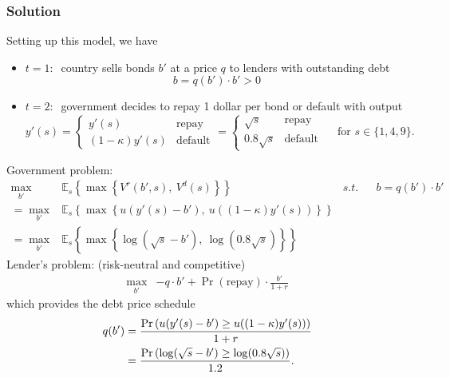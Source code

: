 \documentclass[12pt]{article}
\begin{document}
\begin{enumerate}
\begin{enumerate}[label=(\alph*)]
        \subsubsection*{Solution}

        Setting up this model, we have 
        \begin{itemize}
            \item $t=1: \ $ country sells bonds $b'$ at a price $q$ to lenders with outstanding debt 
            \[ b = q(b') \cdot b' > 0\]
            \item $t=2: \ $ government decides to repay 1 dollar per bond or default with output 
            \[ y'(s) = \begin{cases}
                y'(s) & \text{repay}
                \\ (1-\kappa)y'(s) & \text{default}
            \end{cases} = \begin{cases}
                \sqrt{s} & \text{repay}
                \\ 0.8\sqrt{s}  & \text{default}
            \end{cases} \quad  \text{ for } s \in \{1, 4, 9\}.
            \]
        \end{itemize}
        Government problem: 
        \begin{align*}
            \max_{b'}& \mathbb{E}_s \left\{ \max \left\{ V^r(b',s) , \ V^d(s)  \right\}  \right\} & s.t. &  &b=q(b')\cdot b' 
            \\ =\max_{b'}& \mathbb{E}_s \left\{ \max \left\{u(y'(s) - b') , \ u((1-\kappa)y'(s))  \right\}  \right\}
            \\ =\max_{b'}& \mathbb{E}_s \left\{ \max \left\{\log(\sqrt{s} - b') , \ \log(0.8\sqrt{s})  \right\}  \right\}
        \end{align*}
        Lender's problem: (risk-neutral and competitive)
        \begin{align*}
            \max_{b'}& -q\cdot b' + \Pr(\text{repay}) \cdot \frac{b'}{1+r}
        \end{align*}
        which provides the debt price schedule 
        \begin{align}
            q(b') &= \frac{\Pr\left( u(y'(s) - b') \geq u((1-\kappa)y'(s)) \right)}{1+r}\notag 
            \\ &= \frac{\Pr\left( \log(\sqrt{s} - b') \geq \log(0.8\sqrt{s})   \right)}{1.2}. \label{2a}
        \end{align}


\end{enumerate}
\end{enumerate}
\end{document}
